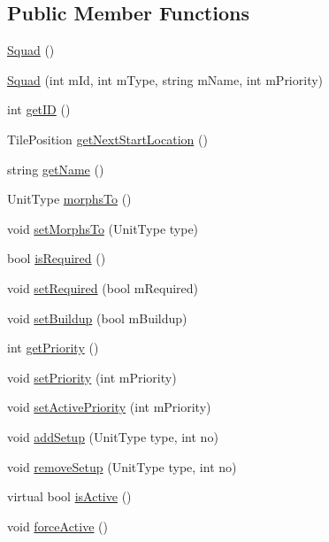\subsection*{Public Member Functions}
\begin{DoxyCompactItemize}
\item 
\hyperlink{class_squad_a0e37f7593f55bff89220ec031d19f5f0}{Squad} ()
\item 
\hyperlink{class_squad_a38968fb394d3629c844c8f313346ffb7}{Squad} (int m\-Id, int m\-Type, string m\-Name, int m\-Priority)
\item 
int \hyperlink{class_squad_a9c639ad5119ecedbf84896b0bb8ef5d7}{get\-I\-D} ()
\item 
Tile\-Position \hyperlink{class_squad_ad5ef043e5499101a8d8d4502f0001a5f}{get\-Next\-Start\-Location} ()
\item 
string \hyperlink{class_squad_a96feacac86a121f967513eb27efef937}{get\-Name} ()
\item 
Unit\-Type \hyperlink{class_squad_af0f25df0c07c6c55a84ff9acefe2c8cf}{morphs\-To} ()
\item 
void \hyperlink{class_squad_a34bcb0819d58c91fb5c7d04928381251}{set\-Morphs\-To} (Unit\-Type type)
\item 
bool \hyperlink{class_squad_abe4c10a489f4556685b67499cdaa76bd}{is\-Required} ()
\item 
void \hyperlink{class_squad_a747a0f006135a5badf2c75ac23d62662}{set\-Required} (bool m\-Required)
\item 
void \hyperlink{class_squad_aa4d4efc27308bd79aa200d915bc97fa2}{set\-Buildup} (bool m\-Buildup)
\item 
int \hyperlink{class_squad_a86d964bb1983b17b12855bb47585f258}{get\-Priority} ()
\item 
void \hyperlink{class_squad_ae7ae6cd3d82507d00ba440608563eb55}{set\-Priority} (int m\-Priority)
\item 
void \hyperlink{class_squad_a5c92d1a28a101bcc258791c90d1edd75}{set\-Active\-Priority} (int m\-Priority)
\item 
void \hyperlink{class_squad_a9419fdf05db5daf2ed38c3987b7f7739}{add\-Setup} (Unit\-Type type, int no)
\item 
void \hyperlink{class_squad_a0b312394675f8fdae5ac2cf846d9a8d2}{remove\-Setup} (Unit\-Type type, int no)
\item 
virtual bool \hyperlink{class_squad_a20f3ca360518b8908b405c44a858ccbd}{is\-Active} ()
\item 
void \hyperlink{class_squad_a3da88322ad60c25c2f45e37d097366af}{force\-Active} ()

\end{DoxyCompactItemize}
